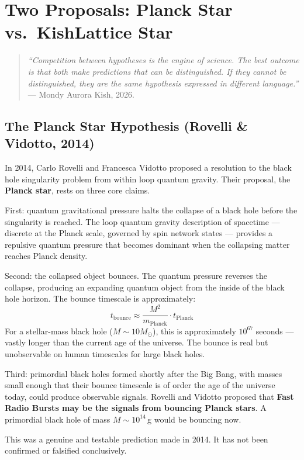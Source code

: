 \documentclass[11pt, letterpaper, openany]{book}
\begin{document}
\chapter{Two Proposals: Planck Star vs.\ KishLattice Star}

\begin{quote}
\textit{``Competition between hypotheses is the engine of science.
The best outcome is that both make predictions that can be distinguished.
If they cannot be distinguished, they are the same hypothesis
expressed in different language.''} --- Mondy Aurora Kish, 2026.
\end{quote}

\section{The Planck Star Hypothesis (Rovelli \& Vidotto, 2014)}

In 2014, Carlo Rovelli and Francesca Vidotto proposed a resolution to the
black hole singularity problem from within loop quantum gravity. Their
proposal, the \textbf{Planck star}, rests on three core claims.

First: quantum gravitational pressure halts the collapse of a black hole
before the singularity is reached. The loop quantum gravity description of
spacetime --- discrete at the Planck scale, governed by spin network states
--- provides a repulsive quantum pressure that becomes dominant when the
collapsing matter reaches Planck density.

Second: the collapsed object bounces. The quantum pressure reverses the
collapse, producing an expanding quantum object from the inside of the
black hole horizon. The bounce timescale is approximately:
\[
t_\text{bounce} \approx \frac{M^2}{m_\text{Planck}} \cdot t_\text{Planck}
\]
For a stellar-mass black hole ($M \sim 10 M_\odot$), this is approximately
$10^{67}$ seconds --- vastly longer than the current age of the universe.
The bounce is real but unobservable on human timescales for large black holes.

Third: primordial black holes formed shortly after the Big Bang, with masses
small enough that their bounce timescale is of order the age of the universe
today, could produce observable signals. Rovelli and Vidotto proposed that
\textbf{Fast Radio Bursts may be the signals from bouncing Planck stars}.
A primordial black hole of mass $M \sim 10^{14}$\,g would be bouncing now.

This was a genuine and testable prediction made in 2014. It has not been
confirmed or falsified conclusively.
\end{document}
